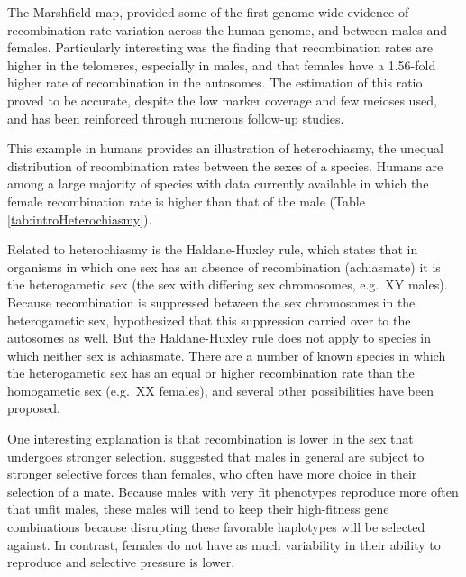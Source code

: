 The Marshfield map\cite{Broman1998}, provided some of the first genome wide evidence of recombination rate variation across the human genome, and between males and females.
Particularly interesting was the finding that recombination rates are higher in the telomeres, especially in males, and that females have a 1.56-fold higher rate of recombination in the autosomes.
The estimation of this ratio proved to be accurate, despite the low marker coverage and few meioses used, and has been reinforced through numerous follow-up studies\cite{Broman2000,Kong2002,Coop2008,Kong2010,Bleazard2013,Campbell2015,Bherer2016}. %

This example in humans provides an illustration of heterochiasmy, the unequal distribution of recombination rates between the sexes of a species.
Humans are among a large majority of species with data currently available in which the female recombination rate is higher than that of the male (Table \ref{tab:introHeterochiasmy}).

Related to heterochiasmy is the Haldane-Huxley rule\cite{Haldane1922,Huxley1928}, which states that in organisms in which one sex has an absence of recombination (achiasmate) it is the heterogametic sex (the sex with differing sex chromosomes, e.g.\ XY males).
Because recombination is suppressed between the sex chromosomes in the heterogametic sex, \citet{Haldane1922} hypothesized that this suppression carried over to the autosomes as well.
But the Haldane-Huxley rule does not apply to species in which neither sex is achiasmate.
There are a number of known species in which the heterogametic sex has an equal or higher recombination rate than the homogametic sex (e.g.\ XX females), and several other possibilities have been proposed.

One interesting explanation is that recombination is lower in the sex that undergoes stronger selection.
\citet{Trivers1988} suggested that males in general are subject to stronger selective forces than females, who often have more choice in their selection of a mate.
Because males with very fit phenotypes reproduce more often that unfit males, these males will tend to keep their high-fitness gene combinations because disrupting these favorable haplotypes will be selected against.
In contrast, females do not have as much variability in their ability to reproduce and selective pressure is lower.

